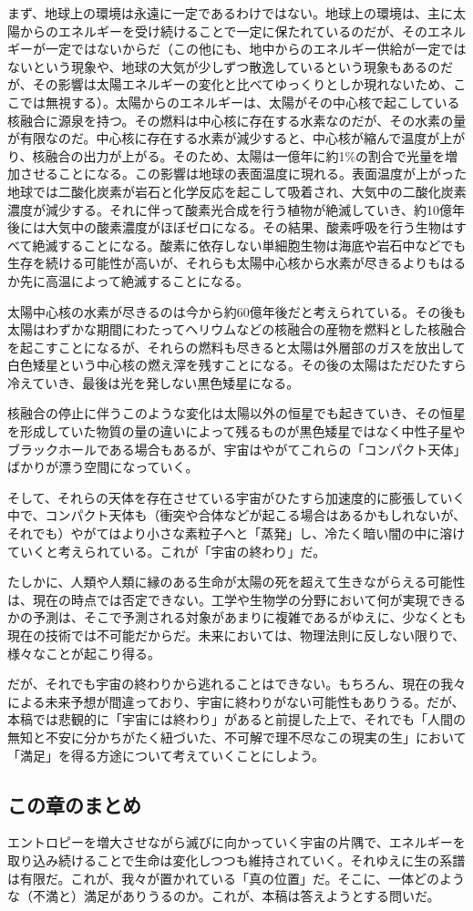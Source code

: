まず、地球上の環境は永遠に一定であるわけではない。地球上の環境は、主に太陽からのエネルギーを受け続けることで一定に保たれているのだが、そのエネルギーが一定ではないからだ（この他にも、地中からのエネルギー供給が一定ではないという現象や、地球の大気が少しずつ散逸しているという現象もあるのだが、その影響は太陽エネルギーの変化と比べてゆっくりとしか現れないため、ここでは無視する）。太陽からのエネルギーは、太陽がその中心核で起こしている核融合に源泉を持つ。その燃料は中心核に存在する水素なのだが、その水素の量が有限なのだ。中心核に存在する水素が減少すると、中心核が縮んで温度が上がり、核融合の出力が上がる。そのため、太陽は一億年に約1\%の割合で光量を増加させることになる。この影響は地球の表面温度に現れる。表面温度が上がった地球では二酸化炭素が岩石と化学反応を起こして吸着され、大気中の二酸化炭素濃度が減少する。それに伴って酸素光合成を行う植物が絶滅していき、約10億年後には大気中の酸素濃度がほぼゼロになる。その結果、酸素呼吸を行う生物はすべて絶滅することになる。酸素に依存しない単細胞生物は海底や岩石中などでも生存を続ける可能性が高いが、それらも太陽中心核から水素が尽きるよりもはるか先に高温によって絶滅することになる。

太陽中心核の水素が尽きるのは今から約60億年後だと考えられている。その後も太陽はわずかな期間にわたってヘリウムなどの核融合の産物を燃料とした核融合を起こすことになるが、それらの燃料も尽きると太陽は外層部のガスを放出して白色矮星という中心核の燃え滓を残すことになる。その後の太陽はただひたすら冷えていき、最後は光を発しない黒色矮星になる。

核融合の停止に伴うこのような変化は太陽以外の恒星でも起きていき、その恒星を形成していた物質の量の違いによって残るものが黒色矮星ではなく中性子星やブラックホールである場合もあるが、宇宙はやがてこれらの「コンパクト天体」ばかりが漂う空間になっていく。

そして、それらの天体を存在させている宇宙がひたすら加速度的に膨張していく中で、コンパクト天体も（衝突や合体などが起こる場合はあるかもしれないが、それでも）やがてはより小さな素粒子へと「蒸発」し、冷たく暗い闇の中に溶けていくと考えられている。これが「宇宙の終わり」だ。

たしかに、人類や人類に縁のある生命が太陽の死を超えて生きながらえる可能性は、現在の時点では否定できない。工学や生物学の分野において何が実現できるかの予測は、そこで予測される対象があまりに複雑であるがゆえに、少なくとも現在の技術では不可能だからだ。未来においては、物理法則に反しない限りで、様々なことが起こり得る。

だが、それでも宇宙の終わりから逃れることはできない。もちろん、現在の我々による未来予想が間違っており、宇宙に終わりがない可能性もありうる。だが、本稿では悲観的に「宇宙には終わり」があると前提した上で、それでも「人間の無知と不安に分かちがたく紐づいた、不可解で理不尽なこの現実の生」において「満足」を得る方途について考えていくことにしよう。

\subsection{この章のまとめ}\label{ux3053ux306eux7ae0ux306eux307eux3068ux3081}

エントロピーを増大させながら滅びに向かっていく宇宙の片隅で、エネルギーを取り込み続けることで生命は変化しつつも維持されていく。それゆえに生の系譜は有限だ。これが、我々が置かれている「真の位置」だ。そこに、一体どのような（不満と）満足がありうるのか。これが、本稿は答えようとする問いだ。
